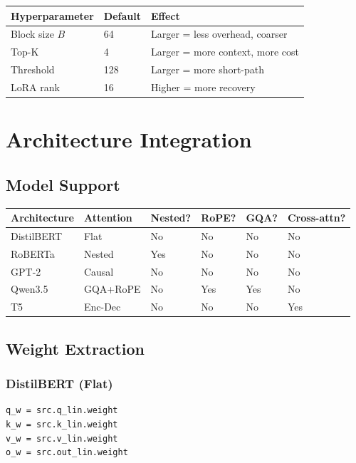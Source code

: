 \begin{table}[H]
\centering
\small
\begin{tabular}{lll}
\toprule
\textbf{Hyperparameter} & \textbf{Default} & \textbf{Effect} \\
\midrule
Block size $B$ & 64 & Larger = less overhead, coarser \\
Top-K & 4 & Larger = more context, more cost \\
Threshold & 128 & Larger = more short-path \\
LoRA rank & 16 & Higher = more recovery \\
\bottomrule
\end{tabular}
\end{table}



\section{Architecture Integration}

\subsection{Model Support}

\begin{table}[H]
\centering
\small
\begin{tabular}{llllll}
\toprule
\textbf{Architecture} & \textbf{Attention} & \textbf{Nested?} & \textbf{RoPE?} & \textbf{GQA?} & \textbf{Cross-attn?} \\
\midrule
DistilBERT & Flat & No & No & No & No \\
RoBERTa & Nested & Yes & No & No & No \\
GPT-2 & Causal & No & No & No & No \\
Qwen3.5 & GQA+RoPE & No & Yes & Yes & No \\
T5 & Enc-Dec & No & No & No & Yes \\
\bottomrule
\end{tabular}
\end{table}

\subsection{Weight Extraction}

\subsubsection{DistilBERT (Flat)}
\begin{lstlisting}
q_w = src.q_lin.weight
k_w = src.k_lin.weight
v_w = src.v_lin.weight
o_w = src.out_lin.weight
\end{lstlisting}

